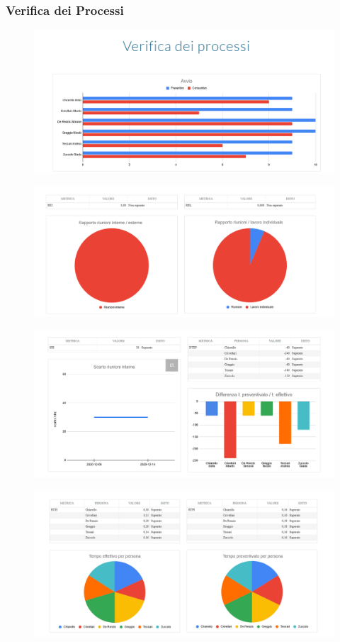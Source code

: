 \subsubsection{Verifica dei Processi}
\begin{figure}[H]
	\includegraphics[scale=0.5]{res/images/cruscotto/avvio_1.png}
\end{figure}
\begin{figure}[H]
	\includegraphics[scale=0.5]{res/images/cruscotto/avvio_2.png}
\end{figure}
\begin{figure}[H]
	\includegraphics[scale=0.5]{res/images/cruscotto/avvio_3.png}
\end{figure}
\begin{figure}[H]
	\includegraphics[scale=0.5]{res/images/cruscotto/avvio_4.png}
\end{figure}

